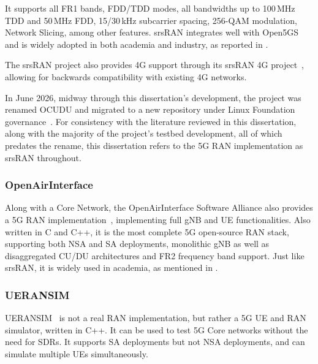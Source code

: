 It supports all FR1 bands, \gls{FDD}/\gls{TDD} modes, all bandwidths up to 100\,MHz \gls{TDD} and 50\,MHz \gls{FDD}, 15/30\,kHz subcarrier spacing, 256-QAM modulation, Network Slicing, among other features. srsRAN integrates well with Open5GS and is widely adopted in both academia and industry, as reported in \cites{horstmann2025open5gcube}{mamushiane2023deploying}{tio2025exploring5g}{vazquez2024maq5g}.

The srsRAN project also provides 4G  support through its srsRAN 4G project~\cite{srsran_4g_repo}, allowing for backwards compatibility with existing 4G networks.

In June 2026, midway through this dissertation's development, the project was renamed OCUDU and migrated to a new repository under Linux Foundation governance~\cite{ocudu_project}. For consistency with the literature reviewed in this dissertation, along with the majority of the project's testbed development, all of which predates the rename, this dissertation refers to the 5G \gls{RAN} implementation as srsRAN throughout.

\subsubsection{OpenAirInterface}
\label{sec:openairinterface_ran}

Along with a Core Network, the OpenAirInterface Software Alliance also provides a 5G \gls{RAN} implementation~\cite{oai5g_repo}, implementing full \gls{gNB} and \gls{UE} functionalities. Also written in C and C++, it is the most complete 5G open-source \gls{RAN} stack, supporting both \gls{NSA} and \gls{SA} deployments, monolithic \gls{gNB} as well as disaggregated \gls{CU}/\gls{DU} architectures and FR2 frequency band support. Just like srsRAN, it is widely used in academia, as mentioned in \cites{bonati2025_5gct}{horstmann2025open5gcube}.

\subsubsection{UERANSIM}
\label{sec:ueransim}

UERANSIM~\cite{ueransim_repo} is not a real \gls{RAN} implementation, but rather a 5G \gls{UE} and \gls{RAN} simulator, written in C++. It can be used to test 5G Core networks without the need for \glspl{SDR}. It supports \gls{SA} deployments but not \gls{NSA} deployments, and can simulate multiple \glspl{UE} simultaneously.

